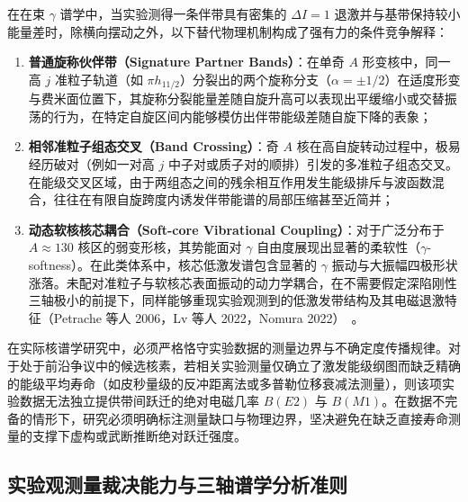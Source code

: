在在束 $\gamma$ 谱学中，当实验测得一条伴带具有密集的 $\Delta I = 1$ 退激并与基带保持较小能量差时，除横向摆动之外，以下替代物理机制构成了强有力的条件竞争解释：
\begin{enumerate}
\item \textbf{普通旋称伙伴带（Signature Partner Bands）}：在单奇 $A$ 形变核中，同一高 $j$ 准粒子轨道（如 $\pi h_{11/2}$）分裂出的两个旋称分支（$\alpha = \pm 1/2$）在适度形变与费米面位置下，其旋称分裂能量差随自旋升高可以表现出平缓缩小或交替振荡的行为，在特定自旋区间内能够模仿出伴带能级差随自旋下降的表象；
\item \textbf{相邻准粒子组态交叉（Band Crossing）}：奇 $A$ 核在高自旋转动过程中，极易经历破对（例如一对高 $j$ 中子对或质子对的顺排）引发的多准粒子组态交叉。在能级交叉区域，由于两组态之间的残余相互作用发生能级排斥与波函数混合，往往在有限自旋跨度内诱发伴带能谱的局部压缩甚至近简并；
\item \textbf{动态软核核芯耦合（Soft-core Vibrational Coupling）}：对于广泛分布于 $A \approx 130$ 核区的弱变形核，其势能面对 $\gamma$ 自由度展现出显著的柔软性（$\gamma$-softness）。在此类体系中，核芯低激发谱包含显著的 $\gamma$ 振动与大振幅四极形状涨落。未配对准粒子与软核芯表面振动的动力学耦合，在不需要假定深陷刚性三轴极小的前提下，同样能够重现实验观测到的低激发带结构及其电磁退激特征（Petrache 等人 2006，Lv 等人 2022，Nomura 2022）~\cite{petrache-2006-near-degenerate-chiral-misinterpretation,lv-2022-evidence-against-wobbling-135pr,nomura-2022-questioning-wobbling-ibfm}。
\end{enumerate}

在实际核谱学研究中，必须严格恪守实验数据的测量边界与不确定度传播规律。对于处于前沿争议中的候选核素，若相关实验测量仅确立了激发能级纲图而缺乏精确的能级平均寿命（如皮秒量级的反冲距离法或多普勒位移衰减法测量），则该项实验数据无法独立提供带间跃迁的绝对电磁几率 $B(E2)$ 与 $B(M1)$。在数据不完备的情形下，研究必须明确标注测量缺口与物理边界，坚决避免在缺乏直接寿命测量的支撑下虚构或武断推断绝对跃迁强度。

\subsection{实验观测量裁决能力与三轴谱学分析准则}\label{sec:3-4-5}


